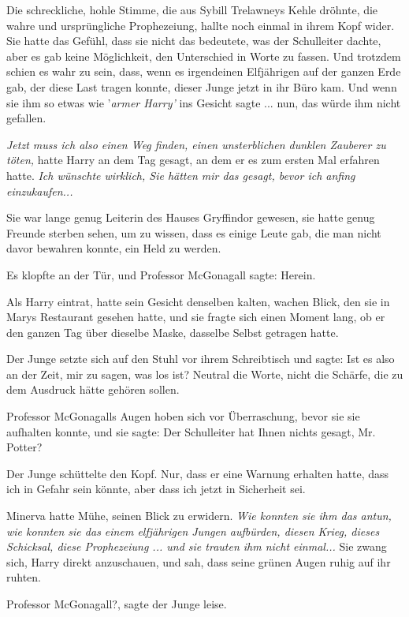 Die schreckliche, hohle Stimme, die aus Sybill Trelawneys Kehle dröhnte, die
wahre und ursprüngliche Prophezeiung, hallte noch einmal in ihrem Kopf wider.
Sie hatte das Gefühl, dass sie nicht das bedeutete, was der Schulleiter dachte,
aber es gab keine Möglichkeit, den Unterschied in Worte zu fassen. Und trotzdem
schien es wahr zu sein, dass, wenn es irgendeinen Elfjährigen auf der ganzen
Erde gab, der diese Last tragen konnte, dieser Junge jetzt in ihr Büro kam. Und
wenn sie ihm so etwas wie '\emph{armer Harry'} ins Gesicht sagte ... nun, das
würde ihm nicht gefallen.

\emph{Jetzt muss ich also einen Weg finden, einen unsterblichen dunklen Zauberer
zu töten,} hatte Harry an dem Tag gesagt, an dem er es zum ersten Mal erfahren
hatte. \emph{Ich wünschte wirklich, Sie hätten mir das gesagt, bevor ich anfing
einzukaufen...}

Sie war lange genug Leiterin des Hauses Gryffindor gewesen, sie hatte genug
Freunde sterben sehen, um zu wissen, dass es einige Leute gab, die man nicht
davor bewahren konnte, ein Held zu werden.

Es klopfte an der Tür, und Professor McGonagall sagte: \glqq{}Herein.\grqq{}

Als Harry eintrat, hatte sein Gesicht denselben kalten, wachen Blick, den sie in
Marys Restaurant gesehen hatte, und sie fragte sich einen Moment lang, ob er den
ganzen Tag über dieselbe Maske, dasselbe Selbst getragen hatte.

Der Junge setzte sich auf den Stuhl vor ihrem Schreibtisch und sagte: \glqq{}Ist
es also an der Zeit, mir zu sagen, was los ist?\grqq{} Neutral die Worte, nicht
die Schärfe, die zu dem Ausdruck hätte gehören sollen.

Professor McGonagalls Augen hoben sich vor Überraschung, bevor sie sie aufhalten
konnte, und sie sagte: \glqq{}Der Schulleiter hat Ihnen nichts gesagt, Mr.
Potter?\grqq{}

Der Junge schüttelte den Kopf. \glqq{}Nur, dass er eine Warnung erhalten hatte,
dass ich in Gefahr sein könnte, aber dass ich jetzt in Sicherheit sei.\grqq{}

Minerva hatte Mühe, seinen Blick zu erwidern. \emph{Wie konnten sie ihm das
antun, wie konnten sie das einem elfjährigen Jungen aufbürden, diesen Krieg,
dieses Schicksal, diese Prophezeiung ... und sie trauten ihm nicht einmal...}
Sie zwang sich, Harry direkt anzuschauen, und sah, dass seine grünen Augen ruhig
auf ihr ruhten.

\glqq{}Professor McGonagall?\grqq{}, sagte der Junge leise.

